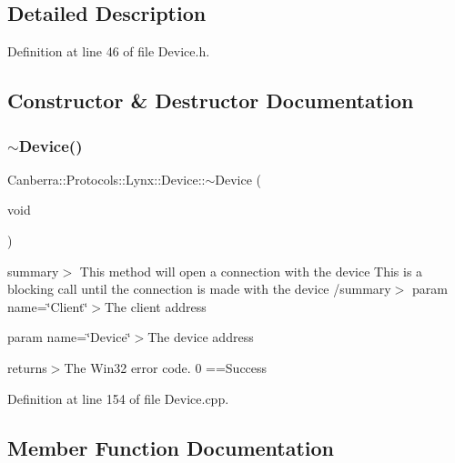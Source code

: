 \subsection{Detailed Description}


Definition at line 46 of file Device.\+h.



\subsection{Constructor \& Destructor Documentation}
\mbox{\label{class_canberra_1_1_protocols_1_1_lynx_1_1_device_a15622214b1e714c404d4772172d4f349_a15622214b1e714c404d4772172d4f349}} 
\subsubsection{\texorpdfstring{$\sim$\+Device()}{~Device()}}
{\footnotesize\ttfamily Canberra\+::\+Protocols\+::\+Lynx\+::\+Device\+::$\sim$\+Device (\begin{DoxyParamCaption}\item[{void}]{ }\end{DoxyParamCaption})\hspace{0.3cm}{\ttfamily [virtual]}}

summary$>$ This method will open a connection with the device This is a blocking call until the connection is made with the device /summary$>$ param name=\char`\"{}\+Client\char`\"{}$>$The client address

param name=\char`\"{}\+Device\char`\"{}$>$The device address

returns$>$The Win32 error code. 0 ==Success

Definition at line 154 of file Device.\+cpp.



\subsection{Member Function Documentation}
\mbox{\label{class_canberra_1_1_protocols_1_1_lynx_1_1_device_a08a8d92f4b2ae149f92c9b4f2fa62dee_a08a8d92f4b2ae149f92c9b4f2fa62dee}} 
